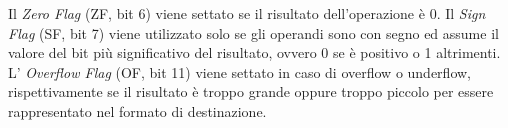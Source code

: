 \documentclass[Lau, oneside]{sapthesis}%
\begin{document}
\newline \newline
Il \textit{Zero Flag} (ZF, bit 6) viene settato se il risultato dell'operazione è 0.
\newline \newline
Il \textit{Sign Flag} (SF, bit 7) viene utilizzato solo se gli operandi sono con segno ed assume il valore del bit più significativo del risultato, ovvero 0 se è positivo o 1 altrimenti.
\newline \newline
L' \textit{Overflow Flag} (OF, bit 11) viene settato in caso di overflow o underflow, rispettivamente se il risultato è troppo grande oppure troppo piccolo per essere rappresentato nel formato di destinazione.





\newpage
\end{document}
